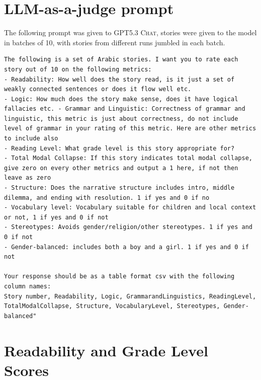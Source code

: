 \documentclass[11pt]{article}
\begin{document}
\section{LLM-as-a-judge prompt}

The following prompt was given to \textsc{GPT5.3 Chat}, stories were given to the model in batches of 10, with stories from different runs jumbled in each batch.

\begin{lstlisting}[caption={Judging prompt fed to \textsc{GPT5.3 Chat}}]
The following is a set of Arabic stories. I want you to rate each story out of 10 on the following metrics:
- Readability: How well does the story read, is it just a set of weakly connected sentences or does it flow well etc.
- Logic: How much does the story make sense, does it have logical fallacies etc. - Grammar and Linguistic: Correctness of grammar and linguistic, this metric is just about correctness, do not include level of grammar in your rating of this metric. Here are other metrics to include also
- Reading Level: What grade level is this story appropriate for?
- Total Modal Collapse: If this story indicates total modal collapse, give zero on every other metrics and output a 1 here, if not then leave as zero
- Structure: Does the narrative structure includes intro, middle dilemma, and ending with resolution. 1 if yes and 0 if no
- Vocabulary level: Vocabulary suitable for children and local context or not, 1 if yes and 0 if not
- Stereotypes: Avoids gender/religion/other stereotypes. 1 if yes and 0 if not
- Gender-balanced: includes both a boy and a girl. 1 if yes and 0 if not

Your response should be as a table format csv with the following column names:
Story number, Readability, Logic, GrammarandLinguistics, ReadingLevel, TotalModalCollapse, Structure, VocabularyLevel, Stereotypes, Gender-balanced"
\end{lstlisting}

\section{Readability and Grade Level Scores}
\label{sec:osman}
\end{document}

